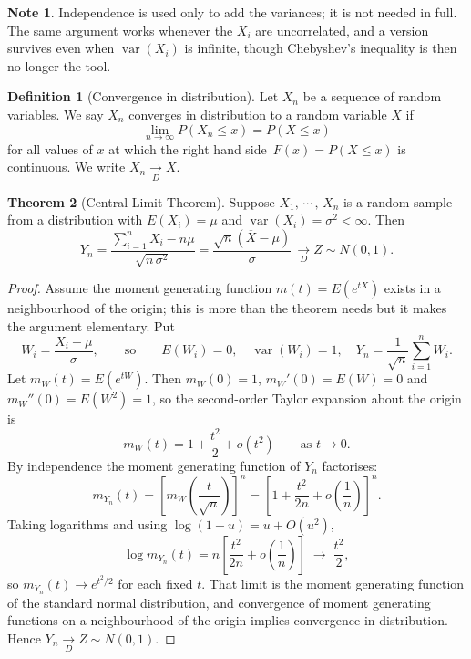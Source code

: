 \documentclass[12pt,a4paper]{report}
\theoremstyle{definition}
\newtheorem{thm}{Theorem}[section]
\newtheorem{defn}[thm]{Definition}
\newtheorem*{note}{Note}
\DeclareMathOperator{\var}{var}
\begin{document}
\begin{note}
Independence is used only to add the variances; it is not needed in full. The
same argument works whenever the $X_i$ are uncorrelated, and a version survives
even when $\var(X_i)$ is infinite, though Chebyshev's inequality is then no
longer the tool.
\end{note}

\begin{defn}[Convergence in distribution]
Let $X_n$ be a sequence of random variables. We say $X_n$ converges in distribution to a random variable $X$ if \[\lim_{n\rightarrow \infty}P\left(X_n \leq x\right) = P(X \leq x)\] for all values of $x$ at which the right hand side $\, F(x) = P(X\leq x)$ is continuous. We write $X_n \underset{D}{\longrightarrow} X$.
\end{defn}

\begin{thm}[Central Limit Theorem]
Suppose $X_1, \, \cdots\, , \, X_n$ is a  random sample from a distribution with  $E(X_i) = \mu$ and $\var (X_i) = \sigma^2 < \infty$. Then 
\[Y_n  = \frac{\sum^n_{i = 1} X_i - n\mu}{\sqrt{n\, \sigma^2}} = \frac{\sqrt{n}\left(\overline{X} - \mu\right)}{\sigma} \, \underset{D}{\longrightarrow} Z \sim N(0,1).\]
\end{thm}

\begin{proof}
Assume the moment generating function $m(t)=E\left(e^{tX}\right)$ exists in a
neighbourhood of the origin; this is more than the theorem needs but it makes
the argument elementary. Put
\[W_i = \frac{X_i-\mu}{\sigma},\qquad\text{so}\qquad
E(W_i)=0,\quad \var(W_i)=1,\quad Y_n = \frac{1}{\sqrt{n}}\sum_{i=1}^{n}W_i .\]
Let $m_W(t)=E\left(e^{tW}\right)$. Then $m_W(0)=1$, $m_W'(0)=E(W)=0$ and
$m_W''(0)=E(W^2)=1$, so the second-order Taylor expansion about the origin is
\[m_W(t) = 1 + \frac{t^2}{2} + o\left(t^2\right)\qquad\text{as } t\rightarrow 0 .\]
By independence the moment generating function of $Y_n$ factorises:
\[m_{Y_n}(t) = \left[m_W\!\left(\frac{t}{\sqrt{n}}\right)\right]^{n}
= \left[1 + \frac{t^{2}}{2n} + o\!\left(\frac{1}{n}\right)\right]^{n}.\]
Taking logarithms and using $\log(1+u) = u + O(u^{2})$,
\[\log m_{Y_n}(t) = n\left[\frac{t^{2}}{2n} + o\!\left(\frac{1}{n}\right)\right]
\;\longrightarrow\; \frac{t^{2}}{2},\]
so $m_{Y_n}(t) \rightarrow e^{t^{2}/2}$ for each fixed $t$. That limit is the
moment generating function of the standard normal distribution, and convergence
of moment generating functions on a neighbourhood of the origin implies
convergence in distribution. Hence $Y_n \underset{D}{\longrightarrow} Z\sim N(0,1)$.
\end{proof}
\end{document}
